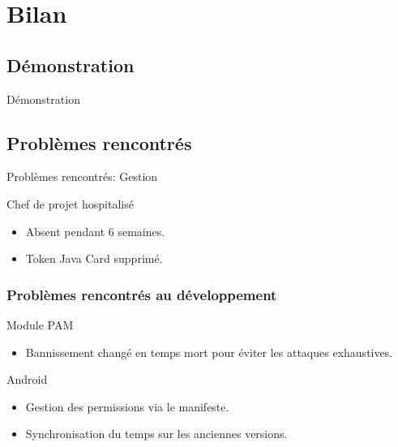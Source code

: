 \documentclass[xcolor=table]{beamer}
\begin{document}
\section{Bilan}

\subsection{Démonstration}
\begin{frame}
\begin{center}
\Huge{Démonstration}
\end{center}
\end{frame}


\subsection{Problèmes rencontrés}
\begin{frame}{Problèmes rencontrés: Gestion}
\begin{block}{Chef de projet hospitalisé}
\begin{itemize}
\item Absent pendant 6 semaines.
\item Token Java Card supprimé.
\end{itemize}
\end{block}

\end{frame}


\begin{frame}
\frametitle{Problèmes rencontrés au développement}
\begin{block}{Module PAM}
\begin{itemize}
\item Bannissement changé en temps mort pour éviter les attaques exhaustives.
\end{itemize}
\end{block}

\begin{block}{Android}
\begin{itemize}
\item Gestion des permissions via le manifeste.
\item Synchronisation du temps sur les anciennes versions.
\end{itemize}

\end{block}
\end{frame}
\end{document}
